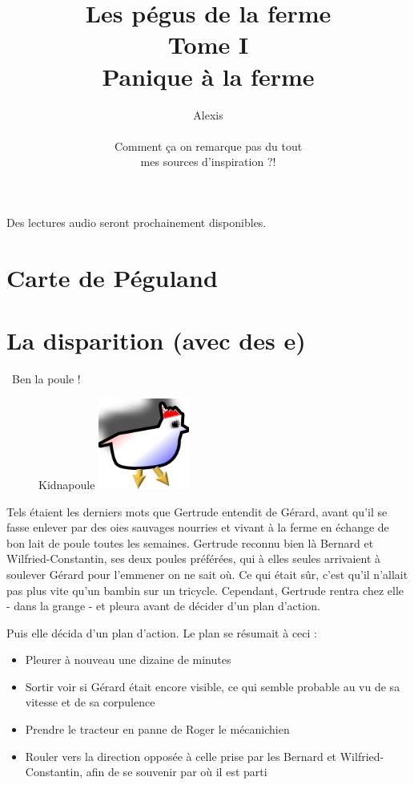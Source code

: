 \documentclass[a5paper, 10pt, twoside]{book}
\title{Les pégus de la ferme\\Tome I\\Panique à la ferme}
\author{Alexis \bsc{Cabodi}\\\\\cg Comment ça on remarque pas du tout\\mes sources d'inspiration ?!\cd}
\date{}
\newcommand{\cg}{\guillemotleft~}
\newcommand{\cd}{~\guillemotright}
\begin{document}
\maketitle

\renewcommand{\contentsname}{Sommaire}
\tableofcontents

\vfill %
Des lectures audio seront prochainement disponibles.


\newpage
\newpage

\chapter*{Carte de Péguland}

\newpage
\newpage


\chapter{La disparition (avec des e)}
\cg Ben la poule !\cd

\begin{figure} %
\begin{center}
Kidnapoule
\includegraphics[width=3cm]{imgs/trobelpoule.png}
\end{center}
\end{figure}
Tels étaient les derniers mots que Gertrude entendit de Gérard, avant qu'il se fasse enlever par des oies sauvages nourries et vivant à la ferme en échange de bon lait de poule toutes les semaines. Gertrude reconnu bien là Bernard et Wilfried-Constantin, ses deux poules préférées, qui à elles seules arrivaient à soulever Gérard pour l'emmener on ne sait où. Ce qui était sûr, c'est qu'il n'allait pas plus vite qu'un bambin sur un tricycle. Cependant, Gertrude rentra chez elle - dans la grange - et pleura avant de décider d'un plan d'action.

Puis elle décida d'un plan d'action. Le plan se résumait à ceci :
\begin{itemize}
	\item Pleurer à nouveau une dizaine de minutes
	\item Sortir voir si Gérard était encore visible, ce qui semble probable au vu de sa vitesse et de sa corpulence
	\item Prendre le tracteur en panne de Roger le mécanichien
	\item Rouler vers la direction opposée à celle prise par les Bernard et Wilfried-Constantin, afin de se souvenir par où il est parti
\end{itemize}
\end{document}
